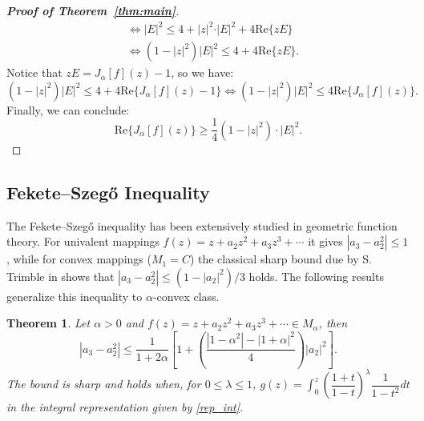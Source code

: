 \documentclass[reqno]{amsart}
\theoremstyle{plain}
\newtheorem{theo}{Theorem}[section]
\theoremstyle{definition}
\begin{document}
\begin{proof}[\textbf{Proof of Theorem~\ref{thm:main}}]
\begin{align*}
        & \Leftrightarrow \lvert E\rvert^2\leq 4+\lvert z\rvert^2\cdot\rvert E\lvert^2+4\text{Re}\{zE\}\\
        & \Leftrightarrow (1-\lvert z\rvert^2)\lvert E\rvert^2\leq 4+4\text{Re}\{zE\}.
    \end{align*}
    Notice that $zE=J_\alpha[f](z)-1$, so we have:
    \begin{equation*}
        (1-\lvert z\rvert^2)\lvert E\rvert^2\leq 4+4\text{Re}\{J_\alpha[f](z)-1\}\Leftrightarrow (1-\lvert z\rvert^2)\lvert E\rvert^2\leq 4\text{Re}\{J_\alpha[f](z)\}.
    \end{equation*}
    Finally, we can conclude:
    \begin{equation*}
        \text{Re}\{J_\alpha[f](z)\}\geq\dfrac{1}{4}(1-\lvert z\rvert^2)\cdot\lvert E\rvert^2.
    \end{equation*}
\end{proof}

\subsection{Fekete--Szeg\H o Inequality} The Fekete--Szeg\H o inequality \cite{FS1933} has been extensively studied in geometric function theory. For univalent mappings $f(z)=z+a_2z^2+a_3z^3+\cdots$ it gives $|a_3-a_2^2|\leq 1$, while for convex mappings ($M_1=C$) the classical sharp bound due by S. Trimble in \cite{Tri1975} shows that $|a_3-a_2^2|\leq (1-|a_2|^2)/3$ holds. The following results generalize this inequality to $\alpha$-convex class.

\begin{theo} Let $\alpha>0$ and $f(z)=z+a_2z^2+a_3z^3+\cdots\in M_\alpha$, then $$|a_3-a_2^2|\leq \dfrac{1}{1+2\alpha}\left[1+\left(\dfrac{|1-\alpha^2|-|1+\alpha|^2}{4}\right)|a_2|^2\right].$$ The bound is sharp and holds when, for $0\leq \lambda\leq 1$, $g(z)=\displaystyle \int_0^z\left(\dfrac{1+t}{1-t}\right)^\lambda \dfrac{1}{1-t^2}dt$ in the integral representation given by \eqref{rep_int}.
\end{theo}
\end{document}
